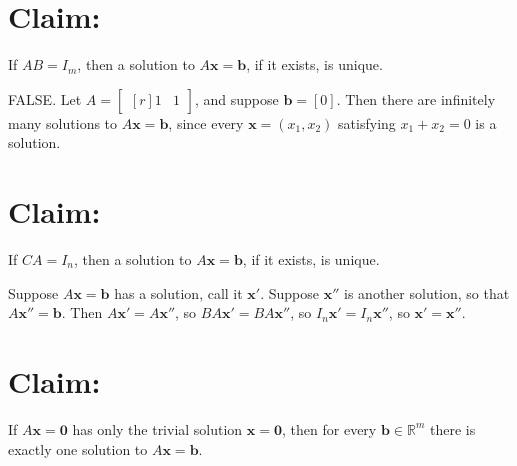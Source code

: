 \documentclass[addpoints,12pt]{exam}
\theoremstyle{remark}
\renewcommand{\vec}[1]{\mathbf{#1}}
\newcommand{\<}{\ensuremath{\langle}}
\renewcommand{\>}{\ensuremath{\rangle}}
\newcommand{\R}{\ensuremath{\mathbb{R}}}
\newcommand\vb{\vec{b}}
\newcommand\vx{\vec{x}}
\newcommand\vzero{\vec{0}}
\begin{document}
\begin{questions}
\begin{parts}
   \part[5]
    {\bf Claim:} If $AB = I_m$, then a solution to $A\vx = \vb$, if it exists, is unique.

      \begin{solution} FALSE.  
        Let $A = \begin{bmatrix*}[r] 1 &1 \end{bmatrix*}$, and suppose $\vb = [0]$.
        Then there are infinitely many solutions to $A\vx =\vb$, since every
        $\vx = (x_1, x_2)$ satisfying $x_1 + x_2 = 0$ is a solution. 
      \end{solution}


   \part[5]
    {\bf Claim:} If $CA = I_n$, then a solution to $A\vx = \vb$, if it exists, is unique.

      \begin{solution}
        Suppose $A\vx = \vb$ has a solution, call it $\vx'$.
        Suppose $\vx''$ is another solution, so that $A\vx'' = \vb$. Then 
        $A\vx' = A\vx''$, so
        $BA\vx' = BA\vx''$, so
        $I_n\vx' = I_n\vx''$, so
        $\vx' = \vx''$.
      \end{solution}


    \part[5]
    {\bf Claim:} If $A\vx = \vzero$ has only the trivial solution $\vx = \vzero$, then 
    for every $\vb\in \R^m$ there is exactly one solution to $A\vx = \vb$.


\end{parts}
\end{questions}
\end{document}
